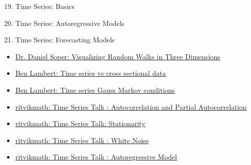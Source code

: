 \documentclass[12pt, titlepage, french]{report}
\begin{document}
\begin{ASM_chapter}
\begin{enumerate}
  \setcounter{enumi}{18}
	\item	Time Series: Basics
	\item	Time Series: Autoregressive Models
	\item	Time Series: Forecasting Models
\end{enumerate}
\end{ASM_chapter}

\begin{YTB_vids}
\begin{itemize}
	\item	\href{https://www.youtube.com/watch?v=7A83lXbs6Ik}{Dr. Daniel Soper: Visualizing Random Walks in Three Dimensions}
	\item	\href{https://www.youtube.com/watch?v=-gmlyRRscXo}{Ben Lambert: Time series vs cross sectional data}
	\item	\href{https://www.youtube.com/watch?v=bWo_ka37szw&list=PLvo9ZnEQG5oXC-cg8ecXr6SJZWprEL1UC&index=3}{Ben Lambert: Time series Gauss Markov conditions}
	\item	\href{https://www.youtube.com/watch?v=DeORzP0go5I&list=PLvcbYUQ5t0UHOLnBzl46_Q6QKtFgfMGc3&index=14}{ritvikmath: Time Series Talk : Autocorrelation and Partial Autocorrelation}
	\item	\href{https://www.youtube.com/watch?v=oY-j2Wof51c&list=PLvcbYUQ5t0UHOLnBzl46_Q6QKtFgfMGc3&index=6}{ritvikmath: Time Series Talk: Stationarity}
	\item	\href{https://www.youtube.com/watch?v=cr4zIXAmSRI}{ritvikmath: Time Series Talk : White Noise}
	\item	\href{https://www.youtube.com/watch?v=5-2C4eO4cPQ}{ritvikmath: Time Series Talk : Autoregressive Model}

\end{itemize}
\end{YTB_vids}
\end{document}
